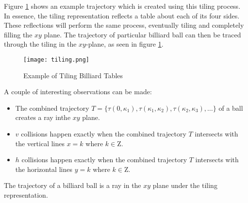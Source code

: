 Figure \ref{fig:tiling} shows an example trajectory which is created using this tiling process. In essence, the tiling representation reflects a table about each of its four sides. These reflections will perform the same process, eventually tiling and completely filling the $xy$ plane. The trajectory of particular billiard ball can then be traced through the tiling in the $xy$-plane, as seen in figure \ref{fig:tiling}.

\begin{figure}
  \texttt{[image: tiling.png]}
  \caption{\label{fig:tiling}Example of Tiling Billiard Tables}
\end{figure}

A couple of interesting observations can be made:

\begin{itemize}
  \item The combined trajectory $T = \{\tau(0, \kappa_1), \tau(\kappa_1, \kappa_2), \tau(\kappa_2, \kappa_3), \ldots \}$ of a ball creates a ray inthe $xy$ plane.
  \item $v$ collisions happen exactly when the combined trajectory $T$ intersects with the vertical lines $x = k$ where $k \in \mathrm{Z}$.
  \item $h$ collisions happen exactly when the combined trajectory $T$ intersects with the horizontal lines $y = k$ where $k \in \mathrm{Z}$.
\end{itemize}

\begin{theorem}
  The trajectory of a billiard ball is a ray in the $xy$ plane under the tiling representation.
\end{theorem}
